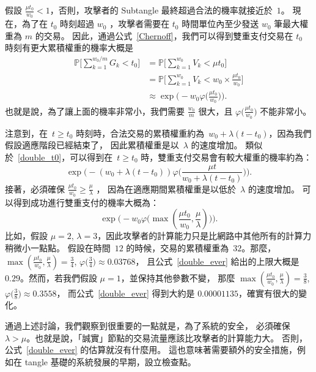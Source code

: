 \documentclass[12pt]{article}
\newcommand{\IP}{\mathbb{P}}
\let\phi=\varphi
\begin{document}
\begin{CJK}{UTF8}{bkai}
假設 $\frac{\mu t_0}{w_0}<1$，否則，攻擊者的 Subtangle 最終超過合法的機率就接近於~$1$。
現在，為了在 $t_0$  時刻超過 $w_0$ ，攻擊者需要在 $t_0$ 時間單位內至少發送 $w_0$ 筆最大權重為 $m$ 的交易。
因此，通過公式~\eqref{Chernoff}，我們可以得到雙重支付交易在 $t_0$ 時刻有更大累積權重的機率大概是
\begin{align}
 \IP\Big[\sum_{k=1}^{w_0/m} G_k  < t_0\Big]
 & = \IP\Big[\sum_{k=1}^{w_0} V_k  < \mu t_0\Big]
\nonumber\\
& = \IP\Big[\sum_{k=1}^{w_0} V_k  < w_0
\times\frac{\mu t_0}{w_0}\Big]
\nonumber\\
 & \approx \exp\big(-w_0
\phi\big(\textstyle\frac{\mu t_0}{w_0}\big)\big).
\label{double_t0}
\end{align}
也就是說，為了讓上面的機率非常小，我們需要 $\frac{w_0}{m}$ 很大，且 $\phi\big(\textstyle\frac{\mu t_0}{w_0}\big)$ 不能非常小。

注意到，在~$t\geq t_0$ 時刻時，合法交易的累積權重約為~$w_0+\lambda (t-t_0)$，因為我們假設適應階段已經結束了，
因此累積權重是以~$\lambda$ 的速度增加。
類似於~\eqref{double_t0}，可以得到在~$t\geq t_0$ 時，雙重支付交易會有較大權重的機率約為：
\begin{equation}
\label{double_t}
 \exp\big(-(w_0+\lambda (t-t_0))
\phi\big(\textstyle\frac{\mu t}{w_0+\lambda (t-t_0)}\big)\big).
\end{equation}
接著，必須確保 $\frac{\mu t_0}{w_0}\geq 
\frac{\mu}{\lambda}$ ， 因為在適應期間累積權重是以低於~$\lambda $ 的速度增加。
可以得到成功進行雙重支付的機率大概為：
\begin{equation}
\label{double_ever}
 \exp\big(-w_0\phi\big(\max(\textstyle\frac{\mu t_0}{w_0},
\frac{\mu}{\lambda})\big)\big).
\end{equation}
比如，假設 $\mu=2$, $\lambda=3$，因此攻擊者的計算能力只是比網路中其他所有的計算力稍微小一點點。
假設在時間~$12$ 的時候，交易的累積權重為~$32$。那麼，
$\max(\frac{\mu t_0}{w_0},\frac{\mu}{\lambda}) = \frac{3}{4}$,
$\phi\big(\frac{3}{4}\big)\approx 0.03768$，
且公式~\eqref{double_ever} 給出的上限大概是$0.29$。然而，若我們假設 $\mu=1$，並保持其他參數不變， 
那麼 $\max(\frac{\mu t_0}{w_0},\frac{\mu}{\lambda}) = \frac{3}{8}$,
$\phi\big(\frac{3}{8}\big)\approx 0.3558$，
而公式~\eqref{double_ever} 得到大約是 $0.00001135$，確實有很大的變化。

通過上述討論，我們觀察到很重要的一點就是，為了系統的安全，
必須確保 $\lambda > \mu$。也就是說，「誠實」節點的交易流量應該比攻擊者的計算能力大。
否則，公式~\eqref{double_ever} 的估算就沒有什麼用。
這也意味著需要額外的安全措施，例如在 tangle 基礎的系統發展的早期，設立檢查點。


\end{CJK}
\end{document}
